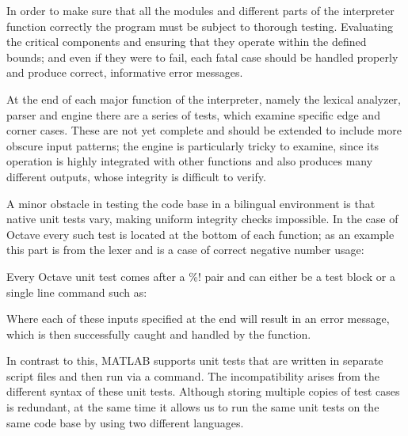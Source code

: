 
In order to make sure that all the modules and different parts of the interpreter function correctly the program must be subject to thorough testing. Evaluating the critical components and ensuring that they operate within the defined bounds; and even if they were to fail, each fatal case should be handled properly and produce correct, informative error messages.

At the end of each major function of the interpreter, namely the lexical analyzer, parser and engine there are a series of tests, which examine specific edge and corner cases. These are not yet complete and should be extended to include more obscure input patterns; the engine is particularly tricky to examine, since its operation is highly integrated with other functions and also produces many different outputs, whose integrity is difficult to verify.

A minor obstacle in testing the code base in a bilingual environment is that native unit tests vary, making uniform integrity checks impossible. In the case of Octave every such test is located at the bottom of each function; as an example this part is from the lexer and is a case of correct negative number usage:

\begin{octave}
\end{octave}

Every Octave unit test comes after a \%! pair and can either be a test block or a single line command such as:

\begin{octave}
\end{octave}

Where each of these inputs specified at the end will result in an error message, which is then successfully caught and handled by the function.

In contrast to this, MATLAB supports unit tests that are written in separate script files and then run via a command. The incompatibility arises from the different syntax of these unit tests. Although storing multiple copies of test cases is redundant, at the same time it allows us to run the same unit tests on the same code base by using two different languages.


